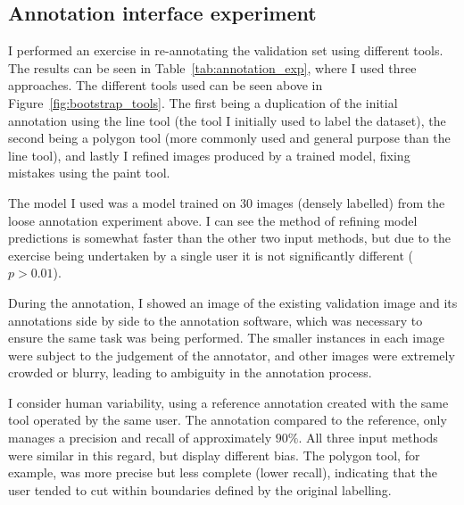 \subsection {Annotation interface experiment}

I performed an exercise in re-annotating the validation set using different tools. The results can be seen in Table~\ref{tab:annotation_exp}, where I used three approaches. The different tools used can be seen above in Figure~\ref{fig:bootstrap_tools}.  The first being a duplication of the initial annotation using the line tool (the tool I initially used to label the dataset), the second being a polygon tool (more commonly used and general purpose than the line tool), and lastly I refined images produced by a trained model, fixing mistakes using the paint tool.

The model I used was a model trained on 30 images (densely labelled) from the loose annotation experiment above. I can see the method of refining model predictions is somewhat faster than the other two input methods, but due to the exercise being undertaken by a single user it is not significantly different ($ p > 0.01 $).

During the annotation, I showed an image of the existing validation image and its annotations side by side to the annotation software, which was necessary to ensure the same task was being performed. The smaller instances in each image were subject to the judgement of the annotator, and other images were extremely crowded or blurry, leading to ambiguity in the annotation process. 

I consider human variability, using a reference annotation created with the same tool operated by the same user. The annotation compared to the reference, only manages a precision and recall of approximately $90\%$. All three input methods were similar in this regard, but display different bias. The polygon tool, for example, was more precise but less complete (lower recall), indicating that the user tended to cut within boundaries defined by the original labelling. 
 
